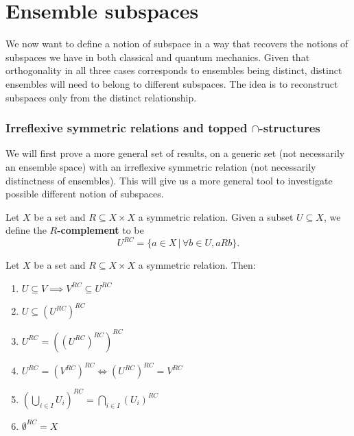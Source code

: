 \section{Ensemble subspaces}

We now want to define a notion of subspace in a way that recovers the notions of subspaces we have in both classical and quantum mechanics. Given that orthogonality in all three cases corresponds to ensembles being distinct, distinct ensembles will need to belong to different subspaces. The idea is to reconstruct subspaces only from the distinct relationship.

\subsubsection{Irreflexive symmetric relations and topped $\cap$-structures}

We will first prove a more general set of results, on a generic set (not necessarily an ensemble space) with an irreflexive symmetric relation (not necessarily distinctness of ensembles). This will give us a more general tool to investigate possible different notion of subspaces.

\begin{defn}
	Let $X$ be a set and $R \subseteq X \times X$ a symmetric relation. Given a subset $U \subseteq X$, we define the \textbf{$R$-complement} to be
	$$ U^{RC} = \{ a \in X \, | \, \forall b \in U, aRb  \}. $$
\end{defn}

\begin{prop}\label{pm_es_rComplProps}
	Let $X$ be a set and $R \subseteq X \times X$ a symmetric relation. Then:
	\begin{enumerate}
		\item $U \subseteq V \implies V^{RC} \subseteq U^{RC}$
		\item $U \subseteq (U^{RC})^{RC}$
		\item $U^{RC} = ((U^{RC})^{RC})^{RC}$
		\item $U^{RC} = (V^{RC})^{RC} \iff (U^{RC})^{RC} = V^{RC}$
		\item $(\bigcup_{i \in I} U_i )^{RC} = \bigcap_{i \in I} (U_i)^{RC}$
		\item $\emptyset^{RC} = X$
	\end{enumerate}
\end{prop}

